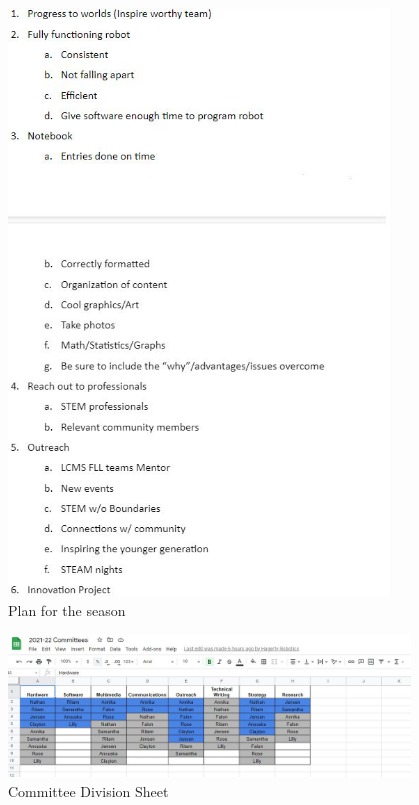 \begin{figure}[htp]
\centering
\includegraphics[width=0.9\textwidth, angle=0]{Meetings/August/08-10-21/8-10-21_Image1 - Nathan Forrer.JPG}
\caption{Plan for the season}
\label{fig:pic1}
\end{figure}

\begin{figure}[htp]
\centering
\begin{minipage}[b]{.48\textwidth}
	\centering
	\includegraphics[width=0.95\textwidth, angle=0]{Meetings/August/08-10-21/8-10-21_Image2 - Nathan Forrer.JPG}
	\caption{Committee Division Sheet}
	\label{fig:pic2}
\end{minipage}%
\end{figure}

